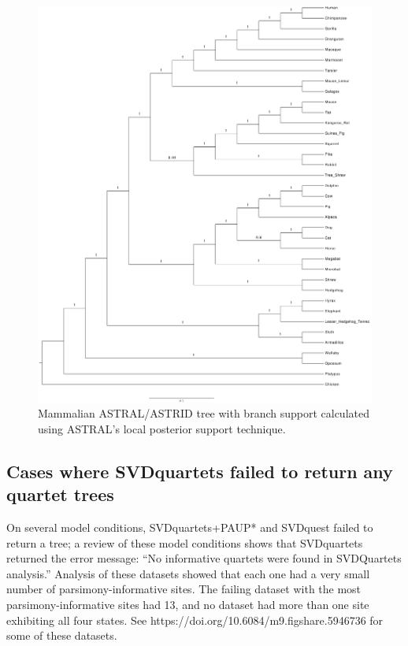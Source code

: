 \begin{figure}
  \centering
  \includegraphics[width=\textwidth]{svdquest-figs/mammalian_astral_ann.pdf}
  \caption[Mammalian species trees computed using ASTRAL and ASTRID, with ASTRAL's local branch support]{Mammalian ASTRAL/ASTRID tree with branch support calculated using ASTRAL's local posterior support technique.}
\label{fig:s12}
\end{figure}

\clearpage

\subsection{Cases where SVDquartets failed to return any quartet trees}
\label{svdquartets-failure}
On several model conditions, SVDquartets+PAUP* and SVDquest failed to return a tree; a review of these model conditions shows that SVDquartets returned the error message:
``No informative quartets were found in SVDQuartets analysis.''
Analysis of these datasets showed that each one had a very small number of parsimony-informative sites. The failing dataset with the most parsimony-informative sites had 13, and no dataset had more than one site exhibiting all four states.
See https://doi.org/10.6084/m9.figshare.5946736 for some of these datasets.
